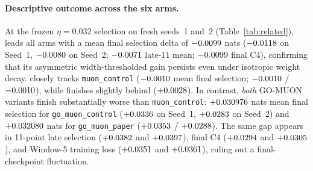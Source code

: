 \paragraph{Descriptive outcome across the six arms.}
At the frozen $\eta = 0.032$ selection on fresh seeds~1 and~2
(Table~\ref{tab:related}),  leads all arms with a mean final
selection delta of $-0.0099{}$ nats ($-0.0118{}$
on Seed~1, $-0.0080{}$ on Seed~2; $-0.0071{}$
late-11 mean; $-0.0099{}$ final C4), confirming that its
asymmetric width-thresholded gain persists even under isotropic weight decay.
 closely tracks \texttt{muon\_control}
($-0.0010{}$ mean final selection;
$-0.0010{}$ / $-0.0010{}$), while
 finishes slightly behind
($+0.0028{}$). In contrast, \emph{both} GO-MUON
variants finish substantially worse than \texttt{muon\_control}:
$+0.030976{}$ nats mean final selection for
\texttt{go\_muon\_control} ($+0.0336{}$ on Seed~1,
$+0.0283{}$ on Seed~2) and $+0.032080{}$
nats for \texttt{go\_muon\_paper} ($+0.0353{}$ /
$+0.0288{}$). The same gap appears in 11-point late
selection ($+0.0382{}$ and $+0.0397{}$),
final C4 ($+0.0294{}$ and
$+0.0305{}$), and Window-5 training loss
($+0.0351{}$ and $+0.0361{}$), ruling out a
final-checkpoint fluctuation.

